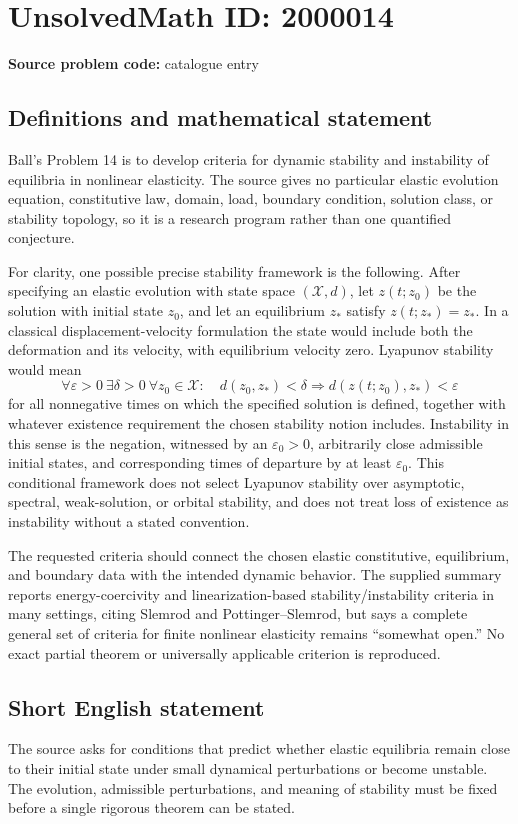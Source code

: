 \documentclass[11pt]{article}
\begin{document}
\section*{UnsolvedMath ID: 2000014}
\textbf{Source problem code:} catalogue entry
\subsection{Definitions and mathematical statement}
Ball's Problem 14 is to develop criteria for dynamic stability and instability of equilibria in nonlinear elasticity. The source gives no particular elastic evolution equation, constitutive law, domain, load, boundary condition, solution class, or stability topology, so it is a research program rather than one quantified conjecture.

For clarity, one possible precise stability framework is the following. After specifying an elastic evolution with state space $(\mathcal X,d)$, let $z(t;z_0)$ be the solution with initial state $z_0$, and let an equilibrium $z_*$ satisfy $z(t;z_*)=z_*$. In a classical displacement-velocity formulation the state would include both the deformation and its velocity, with equilibrium velocity zero. Lyapunov stability would mean
\[
\forall\varepsilon>0\ \exists\delta>0\ \forall z_0\in\mathcal X:\quad
 d(z_0,z_*)<\delta\Longrightarrow
 d(z(t;z_0),z_*)<\varepsilon
\]
for all nonnegative times on which the specified solution is defined, together with whatever existence requirement the chosen stability notion includes. Instability in this sense is the negation, witnessed by an $\varepsilon_0>0$, arbitrarily close admissible initial states, and corresponding times of departure by at least $\varepsilon_0$. This conditional framework does not select Lyapunov stability over asymptotic, spectral, weak-solution, or orbital stability, and does not treat loss of existence as instability without a stated convention.

The requested criteria should connect the chosen elastic constitutive, equilibrium, and boundary data with the intended dynamic behavior. The supplied summary reports energy-coercivity and linearization-based stability/instability criteria in many settings, citing Slemrod and Pottinger--Slemrod, but says a complete general set of criteria for finite nonlinear elasticity remains ``somewhat open.'' No exact partial theorem or universally applicable criterion is reproduced.
\subsection{Short English statement}
The source asks for conditions that predict whether elastic equilibria remain close to their initial state under small dynamical perturbations or become unstable. The evolution, admissible perturbations, and meaning of stability must be fixed before a single rigorous theorem can be stated.
\end{document}
